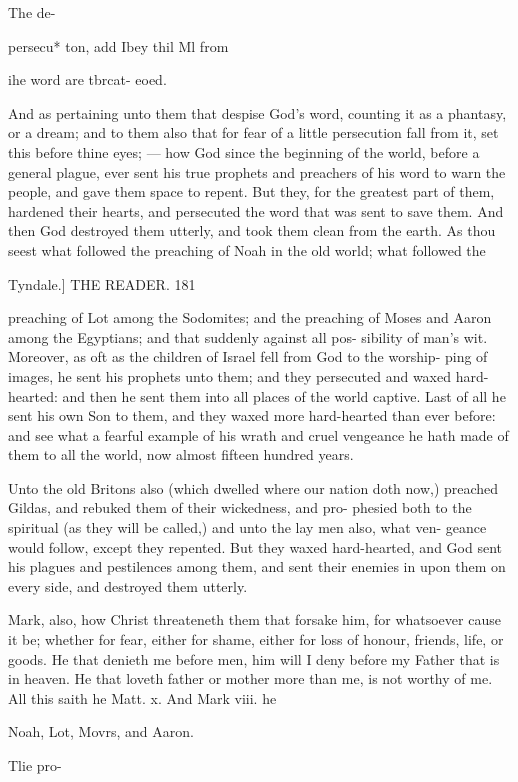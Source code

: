 \documentclass{custom}
\begin{document}
The de- 

persecu* 
ton, add 
Ibey thil 
Ml from 

ihe word 
are tbrcat- 
eoed. 

And as pertaining unto them that despise 
God's word, counting it as a phantasy, or a 
dream; and to them also that for fear of a little 
persecution fall from it, set this before thine 
eyes; — how God since the beginning of the 
world, before a general plague, ever sent his 
true prophets and preachers of his word to warn 
the people, and gave them space to repent. But 
they, for the greatest part of them, hardened 
their hearts, and persecuted the word that was 
sent to save them. And then God destroyed 
them utterly, and took them clean from the earth. 
As thou seest what followed the preaching of 
Noah in the old world; what followed the 


Tyndale.]
THE READER.
181

preaching of Lot among the Sodomites; and
the preaching of Moses and Aaron among the 
Egyptians; and that suddenly against all pos- 
sibility of man's wit. Moreover, as oft as the 
children of Israel fell from God to the worship- 
ping of images, he sent his prophets unto them;
and they persecuted and waxed hard-hearted:
and then he sent them into all places of the world 
captive. Last of all he sent his own Son to 
them, and they waxed more hard-hearted than 
ever before: and see what a fearful example of 
his wrath and cruel vengeance he hath made of 
them to all the world, now almost fifteen 
hundred years. 

Unto the old Britons also (which dwelled 
where our nation doth now,) preached Gildas, 
and rebuked them of their wickedness, and pro- 
phesied both to the spiritual (as they will be 
called,) and unto the lay men also, what ven- 
geance would follow, except they repented. But 
they waxed hard-hearted, and God sent his 
plagues and pestilences among them, and sent 
their enemies in upon them on every side, and 
destroyed them utterly. 

Mark, also, how Christ threateneth them that 
forsake him, for whatsoever cause it be; whether 
for fear, either for shame, either for loss of 
honour, friends, life, or goods. He that denieth 
me before men, him will I deny before my 
Father that is in heaven. He that loveth father 
or mother more than me, is not worthy of me. 
All this saith he Matt. x. And Mark viii. he 

Noah, Lot, 
Movrs, and 
Aaron. 

Tlie pro- 
\end{document}
